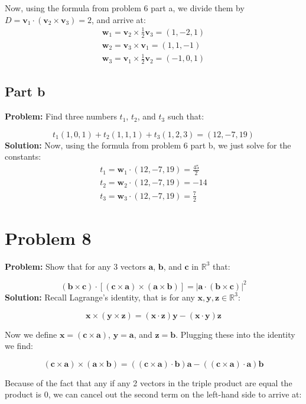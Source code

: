 \documentclass{article}
\begin{document}
Now, using the formula from problem 6 part a, we divide them by $D=\mathbf v_1\cdot(\mathbf v_2\times\mathbf v_3)=2$, and arrive at:
\begin{gather*}
  \mathbf w_1=\mathbf v_2\times\frac{1}{2}\mathbf v_3=(1,-2,1)\\
  \mathbf w_2=\mathbf v_3\times\mathbf v_1=(1,1,-1)\\
  \mathbf w_3=\mathbf v_1\times\frac{1}{2}\mathbf v_2=(-1,0,1)
\end{gather*}

\subsection{Part b}
\textbf{Problem:} Find three numbers $t_1$, $t_2$, and $t_3$ such that:

$$t_1(1,0,1)+t_2(1,1,1)+t_3(1,2,3)=(12,-7,19)$$
\textbf{Solution:} Now, using the formula from problem 6 part b, we just solve for the constants:
\begin{gather*}
  t_1=\mathbf w_1\cdot(12,-7,19)=\frac{45}{2}\\
  t_2=\mathbf w_2\cdot(12,-7,19)=-14\\
  t_3=\mathbf w_3\cdot(12,-7,19)=\frac{7}{2}
\end{gather*}

\section{Problem 8}
\textbf{Problem:} Show that for any 3 vectors $\mathbf a$, $\mathbf b$, and $\mathbf c$ in $\mathbb R^3$ that:

$$(\mathbf b\times\mathbf c)\cdot[(\mathbf c\times\mathbf a)\times(\mathbf a\times\mathbf b)]=|\mathbf a\cdot(\mathbf b\times\mathbf c)|^2$$
\textbf{Solution:} Recall Lagrange's identity, that is for any $\mathbf x,\mathbf y,\mathbf z\in\mathbb R^3$:

$$\mathbf x\times(\mathbf y\times\mathbf z)=(\mathbf x\cdot\mathbf z)\mathbf y-(\mathbf x\cdot\mathbf y)\mathbf z$$

Now we define $\mathbf x=(\mathbf c\times\mathbf a)$, $\mathbf y=\mathbf a$, and $\mathbf z=\mathbf b$. Plugging these into the identity we find:

$$(\mathbf c\times\mathbf a)\times(\mathbf a\times\mathbf b)=((\mathbf c\times\mathbf a)\cdot\mathbf b)\mathbf a-((\mathbf c\times\mathbf a)\cdot\mathbf a)\mathbf b$$

Because of the fact that any if any 2 vectors in the triple product are equal the product is 0, we can cancel out the second term on the left-hand side to arrive at:
\end{document}
